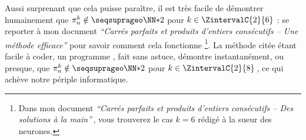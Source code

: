 \leavevmode
\smallskip

Aussi surprenant que cela puisse paraître, il est très facile de démontrer humainement que $\consprod \notin \NNssquare$ pour $k \in \ZintervalC{2}{6}$ :
se reporter à mon document \emph{\enquote{Carrés parfaits et produits d’entiers consécutifs – Une méthode efficace}} pour savoir comment cela fonctionne
\footnote{
	Dans mon document \emph{\enquote{Carrés parfaits et produits d’entiers consécutifs – Des solutions à la main}}\,, vous trouverez le cas $k = 6$ rédigé à la sueur des neurones.
}.
La méthode citée étant facile à coder, un programme \python, fait sans astuce, démontre instantanément, ou presque, que $\consprod \notin \NNssquare$ pour $k \in \ZintervalC{2}{8}$\,, ce qui achève notre périple informatique.